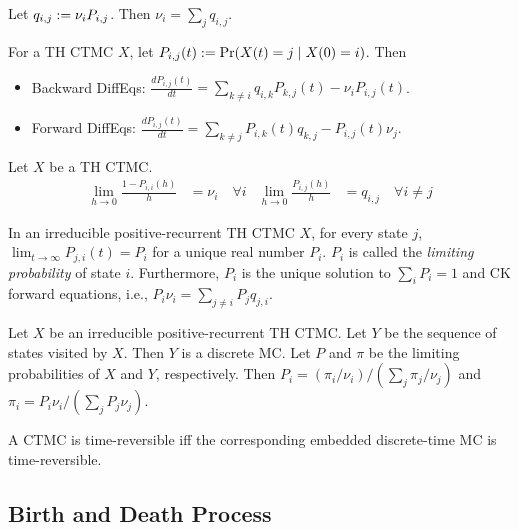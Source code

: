 \documentclass[a4paper, 12pt, fleqn]{article}
\begin{document}
Let $q_{i,j} := \nu_iP_{i,j}$. Then $\nu_i = \sum_j q_{i,j}$.

\begin{theorem}
For a TH CTMC $X$, let $P_{i,j}(t) := \Pr(X(t)=j \mid X(0)=i)$. Then
\begin{itemize}
\item Backward DiffEqs: $\displaystyle \frac{dP_{i,j}(t)}{dt} = \sum_{k \neq i} q_{i,k}P_{k,j}(t) - \nu_iP_{i,j}(t)$.
\item Forward DiffEqs: $\displaystyle \frac{dP_{i,j}(t)}{dt} = \sum_{k \neq j} P_{i,k}(t)q_{k,j} - P_{i,j}(t)\nu_j$.  \end{itemize}
\end{theorem}

\begin{lemma}
Let $X$ be a TH CTMC.
\begin{align*}
\lim_{h \to 0} \frac{1-P_{i,i}(h)}{h} &= \nu_i\quad\forall i
& \lim_{h \to 0} \frac{P_{i,j}(h)}{h} &= q_{i,j}\quad\forall i \neq j
\end{align*}
\end{lemma}

\begin{lemma}
\label{thm:ctmc:limprob}
In an irreducible positive-recurrent TH CTMC $X$, for every state $j$,
$\lim_{t \to \infty} P_{j,i}(t) = P_i$ for a unique real number $P_i$.
$P_i$ is called the \emph{limiting probability} of state $i$.
Furthermore, $P_i$ is the unique solution to $\sum_i P_i = 1$ and CK forward equations,
i.e., $P_i\nu_i = \sum_{j \neq i} P_jq_{j,i}$.
\end{lemma}

\begin{lemma}
Let $X$ be an irreducible positive-recurrent TH CTMC. Let $Y$ be the sequence of states visited by $X$.
Then $Y$ is a discrete MC. Let $P$ and $\pi$ be the limiting probabilities of $X$ and $Y$, respectively.
Then $P_i = (\pi_i/\nu_i)/(\sum_j \pi_j/\nu_j)$ and $\pi_i = P_i\nu_i/(\sum_j P_j\nu_j)$.
\end{lemma}

\begin{definition}
A CTMC is time-reversible iff the corresponding embedded discrete-time MC is time-reversible.
\end{definition}

\subsection{Birth and Death Process}
\end{document}
